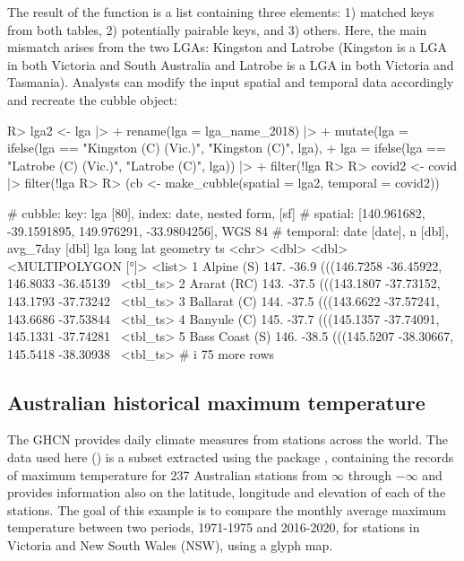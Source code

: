 \documentclass[
]{jss}
\begin{document}
The result of the  function is a list containing three
elements: 1) matched keys from both tables, 2) potentially pairable
keys, and 3) others. Here, the main mismatch arises from the two LGAs:
Kingston and Latrobe (Kingston is a LGA in both Victoria and South
Australia and Latrobe is a LGA in both Victoria and Tasmania). Analysts
can modify the input spatial and temporal data accordingly and recreate
the cubble object:

\begin{CodeChunk}
\begin{CodeInput}
R> lga2 <- lga |>
+   rename(lga = lga_name_2018) |> 
+   mutate(lga = ifelse(lga == "Kingston (C) (Vic.)", "Kingston (C)", lga),
+          lga = ifelse(lga == "Latrobe (C) (Vic.)", "Latrobe (C)", lga)) |>
+   filter(!lga %
R>   
R> covid2 <- covid |> filter(!lga %
R> 
R> (cb <- make_cubble(spatial = lga2, temporal = covid2))
\end{CodeInput}
\begin{CodeOutput}
# cubble:   key: lga [80], index: date, nested form, [sf]
# spatial:  [140.961682, -39.1591895, 149.976291, -33.9804256], WGS 84
# temporal: date [date], n [dbl], avg_7day [dbl]
  lga             long   lat                                   geometry ts      
  <chr>          <dbl> <dbl>                         <MULTIPOLYGON [°]> <list>  
1 Alpine (S)      147. -36.9 (((146.7258 -36.45922, 146.8033 -36.45139~ <tbl_ts>
2 Ararat (RC)     143. -37.5 (((143.1807 -37.73152, 143.1793 -37.73242~ <tbl_ts>
3 Ballarat (C)    144. -37.5 (((143.6622 -37.57241, 143.6686 -37.53844~ <tbl_ts>
4 Banyule (C)     145. -37.7 (((145.1357 -37.74091, 145.1331 -37.74281~ <tbl_ts>
5 Bass Coast (S)  146. -38.5 (((145.5207 -38.30667, 145.5418 -38.30938~ <tbl_ts>
# i 75 more rows
\end{CodeOutput}
\end{CodeChunk}

\hypertarget{historicaltmax}{%
\subsection{Australian historical maximum
temperature}\label{historicaltmax}}

The GHCN provides daily climate measures from stations across the world.
The data used here () is a subset extracted using
the package  \citep{rnoaa}, containing the records of maximum
temperature for 237 Australian stations from \ensuremath{\infty{}}
through \ensuremath{-\infty{}} and provides information also on the
latitude, longitude and elevation of each of the stations. The goal of
this example is to compare the monthly average maximum temperature
between two periods, 1971-1975 and 2016-2020, for stations in Victoria
and New South Wales (NSW), using a glyph map.
\end{document}
